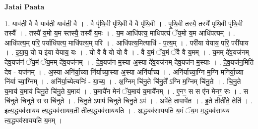 \documentclass[17pt]{extarticle}
\begin{document}
\textbf{Jatai Paata} \newline

1. याव॑ती॒ वै वै याव॑ती॒ याव॑ती॒ वै । . वै पृ॑थि॒वी पृ॑थि॒वी वै वै पृ॑थि॒वी । . पृ॒थि॒वी तस्यै॒ तस्यै॑ पृथि॒वी पृ॑थि॒वी तस्यै᳚ । . तस्यै॑ य॒मो य॒म स्तस्यै॒ तस्यै॑ य॒मः । . य॒म आधि॑पत्य॒ माधि॑पत्यं ॅय॒मो य॒म आधि॑पत्यम् । . आधि॑पत्य॒म् परि॒ पर्याधि॑पत्य॒ माधि॑पत्य॒म् परि॑ । . आधि॑पत्य॒मित्याधि॑ - प॒त्य॒म् । . परी॑या येयाय॒ परि॒ परी॑याय । . इ॒या॒य॒ यो य इ॑या येयाय॒ यः । . यो वै वै यो यो वै । . वै य॒मं ॅय॒मं ॅवै वै य॒मम् । . य॒मम् दे॑व॒यज॑नम् देव॒यज॑नं ॅय॒मं ॅय॒मम् दे॑व॒यज॑नम् । . दे॒व॒यज॑न म॒स्या अ॒स्या दे॑व॒यज॑नम् देव॒यज॑न म॒स्याः । . दे॒व॒यज॑न॒मिति॑ देव - यज॑नम् । . अ॒स्या अनि॑र्या॒च्या नि॑र्याच्या॒स्या अ॒स्या अनि॑र्याच्य । . अनि॑र्याच्या॒ग्नि म॒ग्नि मनि॑र्या॒च्या नि॑र्या च्या॒ग्निम् । . अनि॑र्या॒च्येत्यनिः॑ - या॒च्य॒ । . अ॒ग्निम् चि॑नु॒ते चि॑नु॒ते᳚ ऽग्नि म॒ग्निम् चि॑नु॒ते । . चि॒नु॒ते य॒माय॑ य॒माय॑ चिनु॒ते चि॑नु॒ते य॒माय॑ । . य॒मायै॑न मेनं ॅय॒माय॑ य॒मायै॑नम् । . ए॒नꣳ॒॒ स स ए॑न मेनꣳ॒॒ सः । . स चि॑नुते चिनुते॒ स स चि॑नुते । . चि॒नु॒ते ऽपाप॑ चिनुते चिनु॒ते ऽप॑ । . अपे॑ते॒ तापापे॑त । . इ॒ते तीती॑ते॒ तेति॑ । . इत्य॒द्ध्यव॑सायय त्य॒द्ध्यव॑सायय॒ती तीत्य॒द्ध्यव॑साययति । . अ॒द्ध्यव॑साययति य॒मं ॅय॒म म॒द्ध्यव॑सायय त्य॒द्ध्यव॑साययति य॒मम् । \newline
\end{document}
